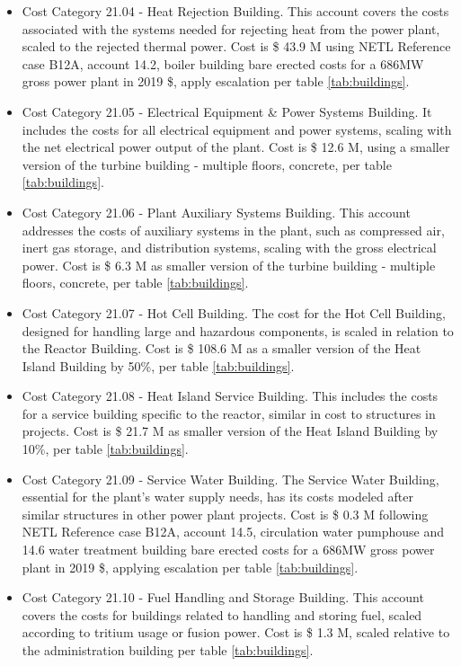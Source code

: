 \begin{itemize}
\item Cost Category 21.04 - Heat Rejection Building. This account covers the costs associated with the systems needed for rejecting heat from the power plant, scaled to the rejected thermal power. Cost is \$ 43.9 M using NETL Reference case B12A, account 14.2, boiler building bare erected costs for a 686MW gross power plant in 2019 \$, apply escalation per table \ref{tab:buildings}. 
\item Cost Category 21.05 - Electrical Equipment \& Power Systems Building. It includes the costs for all electrical equipment and power systems, scaling with the net electrical power output of the plant. Cost is \$ 12.6 M, using a smaller version of the turbine building - multiple floors, concrete, per table \ref{tab:buildings}.
\item Cost Category 21.06 - Plant Auxiliary Systems Building. This account addresses the costs of auxiliary systems in the plant, such as compressed air, inert gas storage, and distribution systems, scaling with the gross electrical power. Cost is \$ 6.3 M as smaller version of the turbine building - multiple floors, concrete, per table \ref{tab:buildings}. 
\item Cost Category 21.07 - Hot Cell Building. The cost for the Hot Cell Building, designed for handling large and hazardous components, is scaled in relation to the Reactor Building.  Cost is \$ 108.6 M as a smaller version of the Heat Island Building by 50\%, per table \ref{tab:buildings}.  
\item Cost Category 21.08 - Heat Island Service Building. This includes the costs for a service building specific to the reactor, similar in cost to structures in projects. Cost is \$ 21.7 M as smaller version of the Heat Island Building by 10\%, per table \ref{tab:buildings}.  
\item Cost Category 21.09 - Service Water Building. The Service Water Building, essential for the plant’s water supply needs, has its costs modeled after similar structures in other power plant projects. Cost is \$ 0.3 M following NETL Reference case B12A, account 14.5, circulation water pumphouse and 14.6 water treatment building bare erected costs for a 686MW gross power plant in 2019 \$, applying escalation per table \ref{tab:buildings}.
\item Cost Category 21.10 - Fuel Handling and Storage Building. This account covers the costs for buildings related to handling and storing fuel, scaled according to tritium usage or fusion power. Cost is \$ 1.3 M, scaled relative to the administration building per table \ref{tab:buildings}. 

\end{itemize}
